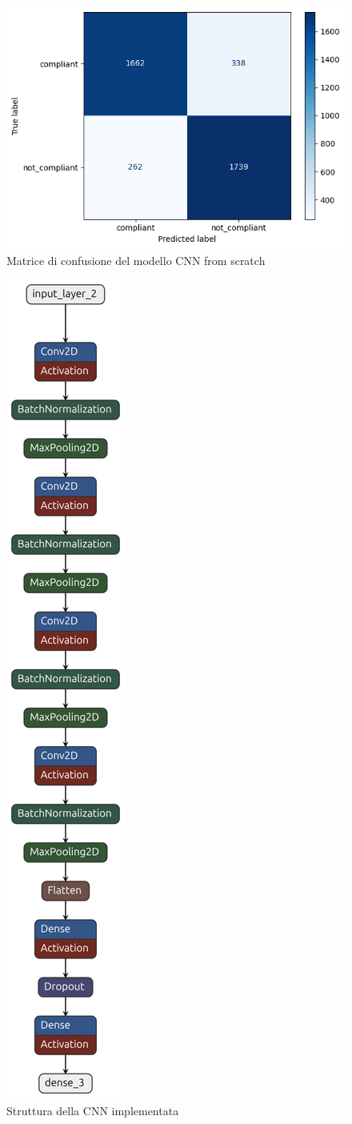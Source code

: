 \documentclass[12pt,a4paper,openright,twoside]{book}
\begin{document}
\begin{figure}
    \centering
    \includegraphics[width=.6\linewidth]{figures/custom-cnn-confusion-matrix.png}
    \caption{Matrice di confusione del modello CNN from scratch}
    \label{fig:custom_cnn_confusion_matrix}
\end{figure}

\begin{figure}
    \centering
    \includegraphics[width=.2\linewidth]{figures/custom-CNN-architecture}
    \caption{Struttura della CNN implementata}
    \label{fig:custom_CNN_architecture}
\end{figure}
\end{document}
